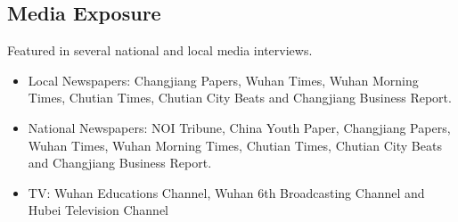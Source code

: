 \documentclass[margin]{res}
\begin{document}
\begin{resume}
\section{Media Exposure}

Featured in several national and local media interviews. 

\begin{itemize}
    \item{Local Newspapers: Changjiang Papers, Wuhan Times, Wuhan Morning Times, Chutian Times, Chutian City Beats and Changjiang Business Report. }
    \item{National Newspapers: NOI Tribune, China Youth Paper, Changjiang Papers, Wuhan Times, Wuhan Morning Times, Chutian Times, Chutian City Beats and Changjiang Business Report. }
    \item{TV: Wuhan Educations Channel, Wuhan 6th Broadcasting Channel and Hubei Television Channel}
\end{itemize}

\end{resume} 
\end{document}
